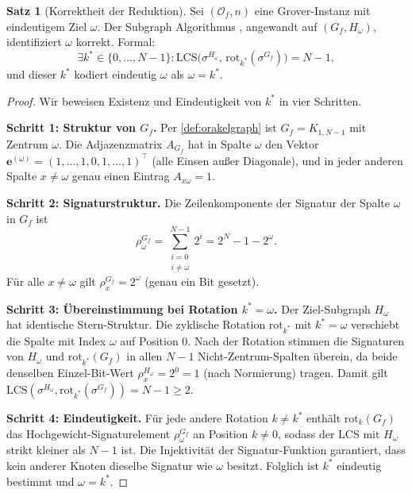 ﻿\documentclass[11pt,a4paper]{article}
\theoremstyle{definition}
\newtheorem{theorem}{Satz}[section]
\begin{document}
\begin{theorem}[Korrektheit der Reduktion]
\label{thm:korrektheit}
  Sei $(\mathcal{O}_f, n)$ eine Grover-Instanz mit eindeutigem Ziel $\omega$.
  Der Subgraph Algorithmus \cite{Epp2026}, angewandt auf $(G_f, H_\omega)$,
  identifiziert $\omega$ korrekt.  Formal:
  \begin{equation}
    \exists k^* \in \{0,\ldots,N-1\} \colon
    \mathrm{LCS}\!\bigl(\sigma^{H_\omega},\, \mathrm{rot}_{k^*}(\sigma^{G_f})\bigr)
    = N-1,
    \label{eq:lcs_bedingung}
  \end{equation}
  und dieser $k^*$ kodiert eindeutig $\omega$ als $\omega = k^*$.
\end{theorem}

\begin{proof}
  Wir beweisen Existenz und Eindeutigkeit von $k^*$ in vier Schritten.

  \textbf{Schritt 1: Struktur von $G_f$.}
  Per \cref{def:orakelgraph} ist $G_f = K_{1,N-1}$ mit Zentrum $\omega$.
  Die Adjazenzmatrix $A_{G_f}$ hat in Spalte $\omega$ den Vektor
  $\mathbf{e}^{(\omega)} = (1,\ldots,1,0,1,\ldots,1)^\top$ (alle Einsen
  außer Diagonale), und in jeder anderen Spalte $x \neq \omega$ genau
  einen Eintrag $A_{x\omega} = 1$.

  \textbf{Schritt 2: Signaturstruktur.}
  Die Zeilenkomponente der Signatur der Spalte $\omega$ in $G_f$ ist
  \begin{equation}
    \rho_\omega^{G_f} = \sum_{\substack{i=0 \\ i \neq \omega}}^{N-1} 2^i
    = 2^N - 1 - 2^\omega.
    \label{eq:rho_omega}
  \end{equation}
  Für alle $x \neq \omega$ gilt $\rho_x^{G_f} = 2^\omega$ (genau ein Bit gesetzt).

  \textbf{Schritt 3: Übereinstimmung bei Rotation $k^* = \omega$.}
  Der Ziel-Subgraph $H_\omega$ hat identische Stern-Struktur.  Die zyklische
  Rotation $\mathrm{rot}_{k^*}$ mit $k^* = \omega$ verschiebt die Spalte mit
  Index $\omega$ auf Position 0.  Nach der Rotation stimmen die Signaturen
  von $H_\omega$ und $\mathrm{rot}_{k^*}(G_f)$ in allen $N-1$ Nicht-Zentrum-Spalten
  überein, da beide denselben Einzel-Bit-Wert $\rho^{H_\omega}_x = 2^0 = 1$ (nach
  Normierung) tragen.  Damit gilt
  $\mathrm{LCS}(\sigma^{H_\omega}, \mathrm{rot}_{k^*}(\sigma^{G_f})) = N-1 \geq 2$.

  \textbf{Schritt 4: Eindeutigkeit.}
  Für jede andere Rotation $k \neq k^*$ enthält $\mathrm{rot}_k(G_f)$ das
  Hochgewicht-Signaturelement $\rho_\omega^{G_f}$ an Position $k \neq 0$,
  sodass der LCS mit $H_\omega$ strikt kleiner als $N-1$ ist.  Die
  Injektivität der Signatur-Funktion \cite{Epp2026} garantiert, dass kein
  anderer Knoten dieselbe Signatur wie $\omega$ besitzt.  Folglich ist $k^*$
  eindeutig bestimmt und $\omega = k^*$.
\end{proof}
\end{document}
